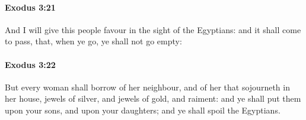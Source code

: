 		\paragraph{Exodus 3:21} %
			\label{EXODUS-3-21}

			And I will give this people favour in the sight of the Egyptians: and it shall come to pass, that, when ye go, ye shall not go empty:


		\paragraph{Exodus 3:22} %
			\label{EXODUS-3-22}

			But every woman shall borrow of her neighbour, and of her that sojourneth in her house, jewels of silver, and jewels of gold, and raiment: and ye shall put them upon your sons, and upon your daughters; and ye shall spoil the Egyptians.

